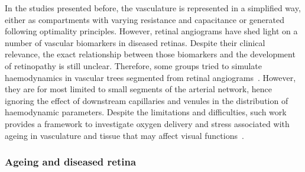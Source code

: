 \documentclass[12pt,a4paper]{article}
\begin{document}
\break

In the studies presented before, the vasculature is represented in a simplified way, either as compartments with varying resistance and capacitance or generated following optimality principles.
However, retinal angiograms have shed light on a number of vascular biomarkers in diseased retinas.
Despite their clinical relevance, the exact relationship between those biomarkers and the development of retinopathy is still unclear.
Therefore, some groups tried to simulate haemodynamics in vascular trees segmented from retinal angiograms~\cite{Aletti_2016, Malek_2015, Liu_2009, Rebhan_2019}.
However, they are for most limited to small segments of the arterial network, hence ignoring the effect of downstream capillaries and venules in the distribution of haemodynamic parameters.
Despite the limitations and difficulties, such work provides a framework to investigate oxygen delivery and stress associated with ageing in vasculature and tissue that may affect visual functions~\cite{Rickett_2010,Sim_2013,Wessel_2012}.

\break

\subsubsection{Ageing and diseased retina}
\end{document}
